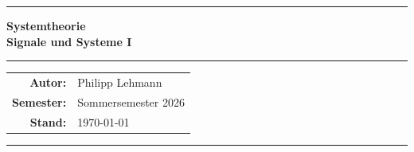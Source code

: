 \documentclass[
  12pt,
  a4paper,
  twoside=false,
  headings=normal,
  parskip=half
]{scrreprt}
\begin{document}
\begin{titlepage}
  \thispagestyle{empty}
  \centering
  \vspace*{3cm}

  {\color{accent}\rule{\linewidth}{1.5pt}}\vspace{0.5em}

  {\fontsize{28}{34}\selectfont\bfseries Systemtheorie}\\[0.4em]
  {\Large\bfseries Signale und Systeme I}

  \vspace{0.4em}
  {\color{accent}\rule{\linewidth}{1.5pt}}

  \vspace{2.5cm}
  \vfill

  \begin{tabular}{@{}rl@{}}
    \textbf{Autor:}    & Philipp Lehmann \\[0.5em]
    \textbf{Semester:} & Sommersemester 2026 \\[0.5em]
    \textbf{Stand:}    & \today
  \end{tabular}

  \vspace{2.5cm}
  {\color{accent}\rule{\linewidth}{0.5pt}}
\end{titlepage}

\pagestyle{plain}
\tableofcontents
\clearpage

\setcounter{page}{1}
\pagestyle{main}
































% 


\end{document}
